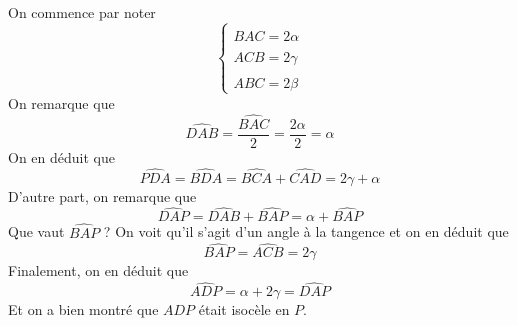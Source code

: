 \begin{sol}
\begin{center}
\end{center}

On commence par noter
$$\begin{cases}
\widehat{BAC} = 2\alpha \\
\widehat{ACB} = 2\gamma \\
\widehat{ABC} = 2\beta
\end{cases}$$
On remarque que
$$\widehat{DAB}=\frac{\widehat{BAC}}2=\frac{2\alpha}2=\alpha $$
On en déduit que
$$\widehat{PDA}=\widehat{BDA}=\widehat{BCA}+\widehat{CAD}=2\gamma+\alpha $$
D'autre part, on remarque que
$$\widehat{DAP}=\widehat{DAB}+\widehat{BAP}=\alpha+\widehat{BAP} $$
Que vaut $\widehat{BAP}$ ? On voit qu'il s'agit d'un angle à la tangence et on en déduit que
$$ \widehat{BAP}=\widehat{ACB}=2\gamma$$
Finalement, on en déduit que
$$\widehat{ADP}=\alpha+2\gamma=\widehat{DAP} $$
Et on a bien montré que $ADP$ était isocèle en $P$.
\end{sol}


